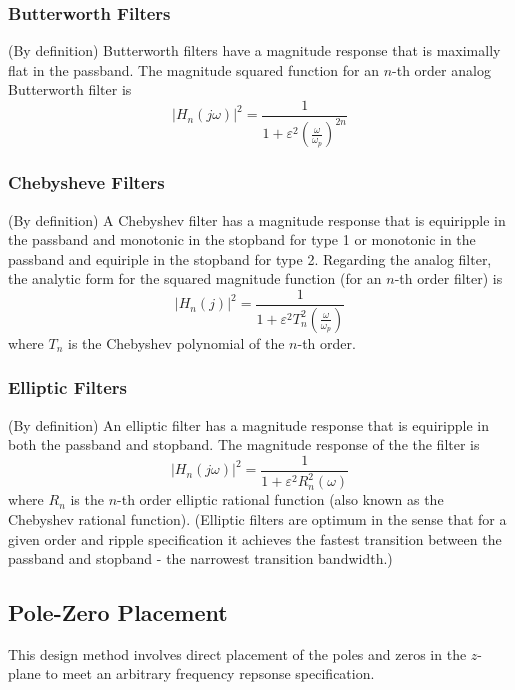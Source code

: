 \documentclass[11pt]{book}
\theoremstyle{example}
\begin{document}
\subsubsection{Butterworth Filters}

(By definition) Butterworth filters have a magnitude response that is maximally flat in the passband. The magnitude squared function for an $n$-th order analog Butterworth filter is
\begin{equation}
	|H_n(j\omega)|^2=\frac{1}{1+\varepsilon^2\left(\frac{\omega}{\omega_p}\right)^{2n}}
\end{equation}

\subsubsection{Chebysheve Filters}
(By definition) A Chebyshev filter has a magnitude response that is equiripple in the passband and monotonic in the stopband for type 1 or monotonic in the passband and equiriple in the stopband for type 2. Regarding the analog filter, the analytic form for the squared magnitude function (for an  $n$-th order filter) is
\begin{equation}
	|H_n(j)|^2=\frac{1}{1+\varepsilon^2T_n^2\left(\frac{\omega}{\omega_p}\right)}
\end{equation}
where $T_n$ is the Chebyshev polynomial of the $n$-th order.

\subsubsection{Elliptic Filters}
(By definition) An elliptic filter has a magnitude response that is equiripple in both the passband and stopband. The magnitude response of the the filter is
\begin{equation}
	|H_n(j\omega)|^2=\frac{1}{1+\varepsilon^2R_n^2(\omega)}
\end{equation}
where $R_n$ is the $n$-th order elliptic rational function (also known as the Chebyshev rational function). (Elliptic filters are optimum in the sense that for a given order and ripple specification it achieves the fastest transition between the passband and stopband - the narrowest transition bandwidth.) 

\subsection{Pole-Zero Placement}

This design method involves direct placement of the poles and zeros in the $z$-plane to meet an arbitrary frequency repsonse specification.
\end{document}
